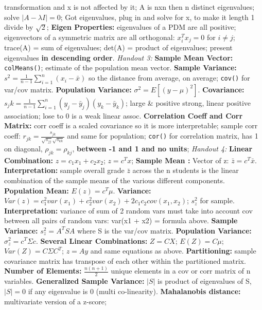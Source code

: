 \documentclass[9pt]{extarticle}
\begin{document}
transformation and x is not affected by it; A is nxn then n distinct 
eigenvalues; solve $|A - \lambda I| = 0$; Got eigenvalues, plug in and solve 
for x, to make it length 1 divide by $\sqrt{2}$;
\textbf{Eigen Properties:} eigenvalues of a PDM are all positive; eigenvectors 
of a symmetric matrix are all orthogonal: $x_i^Tx_j = 0$ for $i \neq j$; 
trace(A) = sum of eigenvalues; det(A) = product of eigenvalues; present 
eigenvalues \textbf{in descending order}.
\textit{Handout 3:}
\textbf{Sample Mean Vector:} \texttt{colMeans()}; estimate of the population 
mean vector.
\textbf{Sample Variance:} $s^2 = \frac{1}{n-1} \sum_{i=1}^n (x_i - \bar{x})$ so 
the distance from average, on average; \texttt{cov()} for var/cov matrix.
\textbf{Population Variance:} $\sigma^2 = E[(y - \mu)^2]$.
\textbf{Covariance:} $s_jk = \frac{1}{n-1} \sum_{i=1}^n (y_{j} - \bar{y}_j)
(y_{k} - \bar{y}_k)$; large \& positive strong, linear positive association; 
lose to 0 is a weak linear assoc.
\textbf{Correlation Coeff and Corr Matrix:} corr coeff is a scaled covariance so 
it is more interpretable; sample corr coeff: $r_{jk} = \frac{s_{jk}}{
    \sqrt{s_{jj}}\sqrt{s_{kk}}}$ and same for population; \texttt{cor()} for
correlation matrix, has 1 on diagonal, $\rho_{jk} = \rho_{kj}$, \textbf{between
-1 and 1 and no units};
\textit{Handout 4:}
\textbf{Linear Combination:} $z = c_1x_1 + c_2x_2$; $z = c^Tx$; 
\textbf{Sample Mean :} Vector of z: $\bar{z} = c^T\bar{x}$. 
\textbf{Interpretation:} sample overall grade $\bar{z}$ across the n students 
is the linear combination of the sample means of the various different 
components.
\textbf{Population Mean:} $E(z) = c^T\mu$.
\textbf{Variance:} $Var(z) = c_1^2var(x_1) + c_2^2var(x_2) + 2c_1c_2 
cov(x_1, x_2)$; $s_z^2$ for sample.
\textbf{Interpretation:} variance of sum of 2 random vars must take into 
account cov between all pairs of random vars: var(x1 + x2) = formula above.
\textbf{Sample Variance:} $s_z^2 = A^TSA$ where S is the var/cov matrix.
\textbf{Population Variance:} $\sigma_z^2 = c^T\Sigma c$.
\textbf{Several Linear Combinations:} $Z = CX$; $E(Z) = C\mu$; $Var(Z) =
C\Sigma C^T$; $z = Ay$ and same equations as above.
\textbf{Partitioning:} sample covariance matrix has transpose of each other 
within the partitioned matrix.
\textbf{Number of Elements:} $\frac{n(n+1)}{2}$ unique elements in a 
cov or corr matrix of n variables.
\textbf{Generalized Sample Variance:} $|S|$ is product of eigenvalues of S,  
$|S| = 0$ if any eigenvalue is 0 (multi co-linearity).
\textbf{Mahalanobis distance:} multivariate version of a z-score;
\end{document}
